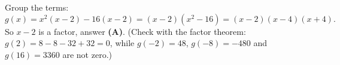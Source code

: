 Group the terms:
\[
g(x)=x^2(x-2)-16(x-2)=(x-2)(x^2-16)=(x-2)(x-4)(x+4).
\]
So $x-2$ is a factor, answer \textbf{(A)}. (Check with the factor theorem: $g(2)=8-8-32+32=0$, while $g(-2)=48$, $g(-8)=-480$ and $g(16)=3360$ are not zero.)
